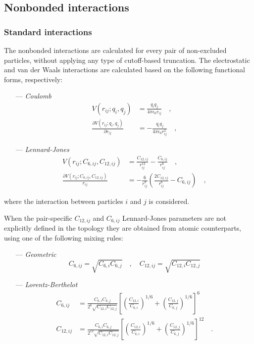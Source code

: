 \documentclass[10pt,a4paper,openany]{memoir}
\numberwithin{equation}{section}
\begin{document}
\subsection{Nonbonded interactions}
\label{sec:nonbonded}

\subsubsection{Standard interactions}
\label{sec:standard-lj-interactions}

The nonbonded interactions are calculated for every pair of
non-excluded particles, without applying any type of cutoff-based
truncation.  The electrostatic and van der Waals interactions are
calculated based on the following functional forms, respectively:\cite{GROMOS-doc,GROMACS-doc}

\begin{itemize}
\item[---] \textit{Coulomb}
  \begin{align}
  \label{eq:coulomb-term}
    V(r_{ij};q_i,q_j) & = \frac{q_i q_j}{4\pi\epsilon_0 r_{ij}} \quad , \\ \nonumber
    \frac{\partial V(r_{ij};q_i,q_j)}{\partial r_{ij}} & = -\frac{q_i q_j}{4 \pi \epsilon_0 r_{ij}^2} \quad ,
\end{align}
\item[---] \textit{Lennard-Jones}
    \begin{align}
  \label{eq:lj-term}
      V(r_{ij};C_{6,ij},C_{12,ij}) & = \frac{C_{12,ij}}{r_{ij}^{12}} - \frac{C_{6,ij}}{r_{ij}^6} \quad , \\ \nonumber
      \frac{\partial V(r_{ij};C_{6,ij},C_{12,ij})}{r_{ij}} & = -\frac{6}{r_{ij}^8}\left(\frac{2C_{12,ij}}{r_{ij}^{6}} - C_{6,ij} \right) \quad ,
\end{align}
\end{itemize}
where the interaction between particles $i$ and $j$ is considered.

When the pair-specific $C_{12,ij}$ and
$C_{6,ij}$ Lennard-Jones parameters are not explicitly defined in the topology
they are obtained from atomic
counterparts, using one of the following mixing rules:
\begin{itemize}
\item [---] \textit{Geometric}
  \begin{equation}
    \label{eq:geometric-mix}
    C_{6,ij} = \sqrt{C_{6,i}C_{6,j}} \quad , \quad C_{12,ij} = \sqrt{C_{12,i}C_{12,j}}
  \end{equation}
\item [---]\textit{Lorentz-Berthelot}
  \begin{align}
    \label{eq:lorentz-mix}
    C_{6,ij} &= \frac{C_{6,i}C_{6,j}}{2^6 \sqrt{C_{12,i}C_{12,j}}}\left[\left(\frac{C_{12,i}}{C_{6,i}}\right)^{1/6} + \left(\frac{C_{12,j}}{C_{6,j}}\right)^{1/6} \right]^6  \\ \nonumber
    C_{12,ij} &= \frac{C_{6,i}C_{6,j}}{2^{12} \sqrt{C_{12,i}C_{12,j}}}\left[\left(\frac{C_{12,i}}{C_{6,i}}\right)^{1/6} + \left(\frac{C_{12,j}}{C_{6,j}}\right)^{1/6} \right]^{12} \quad .
  \end{align}
\end{itemize}
\end{document}
